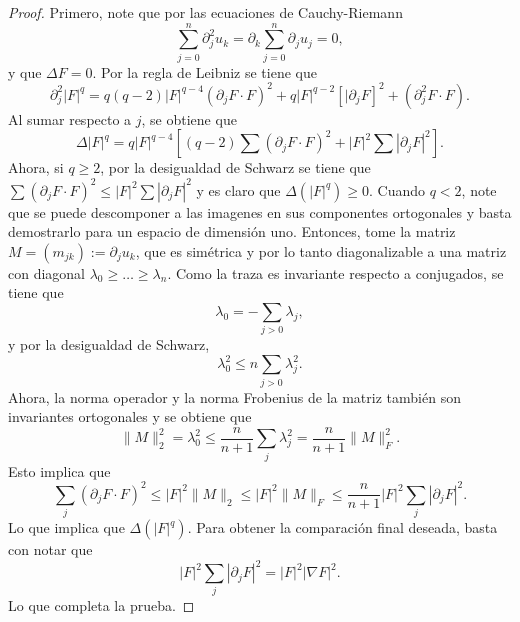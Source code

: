 \begin{proof}
	Primero, note que por las ecuaciones de Cauchy-Riemann
	\begin{equation*}
		\sum_{j=0}^n \partial_j^2 u_k = \partial_k\sum_{j=0}^n \partial_ju_j = 0,
	\end{equation*}
	y que $\Delta F=0$. Por la regla de Leibniz se tiene que
	\begin{equation*}
		\partial_j^2 |F|^q = q(q-2)|F|^{q-4}(\partial_j F\cdot F)^2 + q|F|^{q-2}[|\partial_jF]^2 + (\partial^2_jF\cdot F).
	\end{equation*}
	Al sumar respecto a $j$, se obtiene que
	\begin{equation*}
		\Delta|F|^q = q|F|^{q-4} \left[ (q-2)\sum (\partial_jF\cdot F)^2 + |F|^2\sum |\partial_jF|^2
		\right].
	\end{equation*}
	Ahora, si $q\geq2$, por la desigualdad de Schwarz se tiene que $\sum(\partial_jF\cdot F)^2 \leq |F|^2\sum|\partial_jF|^2$ y es claro que $\Delta(|F|^q)\geq 0$. Cuando $q<2$, note que se puede descomponer a las imagenes en sus componentes ortogonales y basta demostrarlo para un espacio de dimensión uno. Entonces, tome la matriz $M=(m_{jk}) := \partial_ju_k$, que es simétrica y por lo tanto diagonalizable a una matriz con diagonal $\lambda_0\geq\ldots\geq\lambda_n$. Como la traza es invariante respecto a conjugados, se tiene que
	\begin{equation*}
		\lambda_0 = -\sum_{j>0}\lambda_j,
	\end{equation*}
	y por la desigualdad de Schwarz,
	\begin{equation*}
		\lambda_0^2 \leq n \sum_{j>0} \lambda_j^2.
	\end{equation*}
	Ahora, la norma operador y la norma Frobenius de la matriz también son invariantes ortogonales y se obtiene que 
	\begin{equation*}
		\|M\|_{2}^2 = \lambda_0^2 \leq \frac{n}{n+1} \sum_{j}\lambda_j^2 = \frac{n}{n+1} \|M\|_{F}^2.
	\end{equation*}
	Esto implica que 
	\begin{equation*}
		\sum_j(\partial_jF\cdot F)^2 \leq |F|^2\|M\|_{2} \leq |F|^2\|M\|_F \leq  \frac{n}{n+1}  |F|^2\sum_j|\partial_jF|^2.
	\end{equation*}
	Lo que implica que $\Delta(|F|^q)$. Para obtener la comparación final deseada, basta con notar que 
	\begin{equation*}
		|F|^2\sum_j|\partial_jF|^2 = |F|^2|\nabla F|^2.
	\end{equation*}
	Lo que completa la prueba.
\end{proof}
